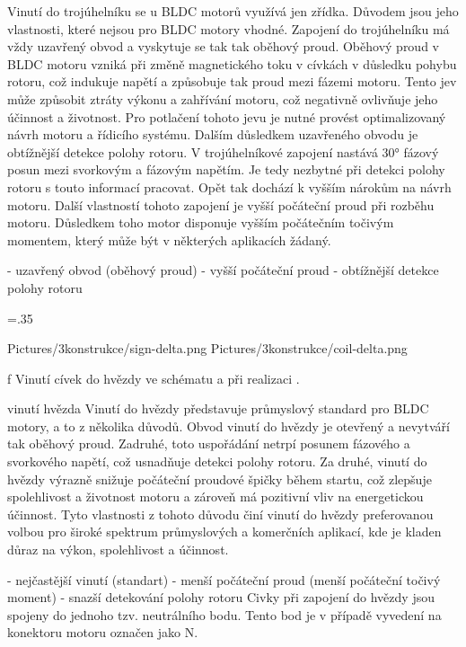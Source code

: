 Vinutí do trojúhelníku se u BLDC motorů využívá jen zřídka. Důvodem jsou jeho vlastnosti, které nejsou pro BLDC motory vhodné.
Zapojení do trojúhelníku má vždy uzavřený obvod a vyskytuje se tak tak oběhový proud.
Oběhový proud v BLDC motoru vzniká při změně magnetického toku v cívkách v důsledku pohybu rotoru, což indukuje napětí a způsobuje tak
proud mezi fázemi motoru. Tento jev může způsobit ztráty výkonu a zahřívání motoru, což negativně ovlivňuje jeho účinnost a životnost. 
Pro potlačení tohoto jevu je nutné provést optimalizovaný návrh motoru a řídicího systému. 
Dalším důsledkem uzavřeného obvodu je obtížnější detekce polohy rotoru.
V trojúhelníkové zapojení nastává 30° fázový posun mezi svorkovým a fázovým napětím. Je tedy nezbytné 
při detekci polohy rotoru s touto informací pracovat. Opět tak dochází k vyšším nárokům na návrh motoru.
Další vlastností tohoto zapojení je vyšší počáteční proud při rozběhu motoru. Důsledkem toho motor disponuje 
vyšším počátečním točivým momentem, který může být v některých aplikacích žádaný. 

- uzavřený obvod (oběhový proud)
- vyšší počáteční proud
- obtížnější detekce polohy rotoru


\medskip
\picw=.35\hsize
{} %
\centerline {\inspic Pictures/3konstrukce/sign-delta.png  \hfil\hfil \inspic Pictures/3konstrukce/coil-delta.png  }\nobreak
\caption/f Vinutí cívek do hvězdy ve schématu a při realizaci .
 \medskip

\secc vinutí hvězda
Vinutí do hvězdy představuje průmyslový standard pro BLDC motory, a to z několika důvodů.
Obvod vinutí do hvězdy je otevřený a nevytváří tak oběhový proud. 
Zadruhé, toto uspořádání netrpí posunem fázového a svorkového napětí, což usnadňuje detekci polohy rotoru.
Za druhé, vinutí do hvězdy výrazně snižuje počáteční proudové špičky během startu, 
což zlepšuje spolehlivost a životnost motoru a zároveň má pozitivní vliv na energetickou účinnost.
Tyto vlastnosti z tohoto důvodu činí vinutí do hvězdy preferovanou volbou pro široké spektrum průmyslových
 a komerčních aplikací, kde je kladen důraz na výkon, spolehlivost a účinnost.

- nejčastější vinutí (standart)
- menší počáteční proud (menší počáteční točivý moment)
- snazší detekování polohy rotoru
Civky při zapojení do hvězdy jsou spojeny do jednoho tzv. neutrálního 
bodu. Tento bod je v případě vyvedení na konektoru motoru označen jako N. 


